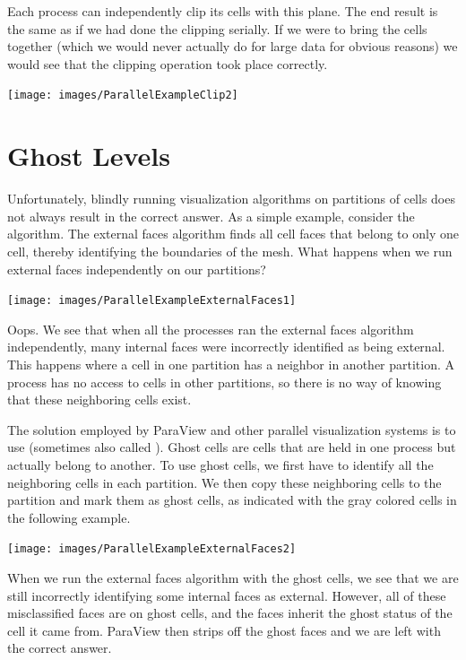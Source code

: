 Each process can independently clip its cells with this plane.  The end
result is the same as if we had done the clipping serially.  If we were to
bring the cells together (which we would never actually do for large data
for obvious reasons) we would see that the clipping operation took place
correctly.

\begin{inlinefig}
  \texttt{[image: images/ParallelExampleClip2]}
\end{inlinefig}


\section{Ghost Levels}

Unfortunately, blindly running visualization algorithms on partitions of
cells does not always result in the correct answer.  As a simple example,
consider the  algorithm.  The external faces
algorithm finds all cell faces that belong to only one cell, thereby
identifying the boundaries of the mesh. What happens when we run external
faces independently on our partitions?

\begin{inlinefig}
  \texttt{[image: images/ParallelExampleExternalFaces1]}
\end{inlinefig}

Oops.  We see that when all the processes ran the external faces algorithm
independently, many internal faces were incorrectly identified as being
external.  This happens where a cell in one partition has a neighbor in
another partition.  A process has no access to cells in other partitions,
so there is no way of knowing that these neighboring cells exist.

The solution employed by ParaView and other parallel visualization systems
is to use  (sometimes also called
).  Ghost cells are cells that are held in one
process but actually belong to another.  To use ghost cells, we first have
to identify all the neighboring cells in each partition.  We then copy
these neighboring cells to the partition and mark them as ghost cells, as
indicated with the gray colored cells in the following example.

\begin{inlinefig}
  \texttt{[image: images/ParallelExampleExternalFaces2]}
\end{inlinefig}

When we run the external faces algorithm with the ghost cells, we see that
we are still incorrectly identifying some internal faces as external.
However, all of these misclassified faces are on ghost cells, and the faces
inherit the ghost status of the cell it came from.  ParaView then strips
off the ghost faces and we are left with the correct answer.

